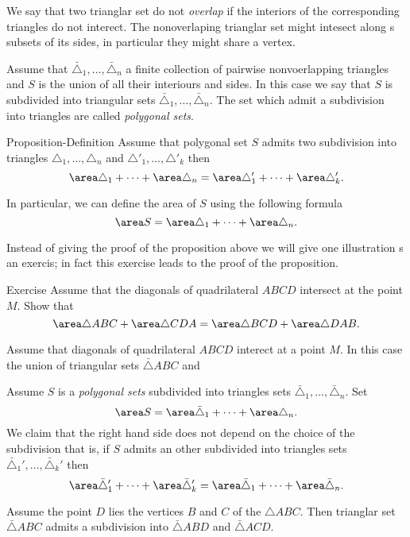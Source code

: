 We say that two trianglar set do not \emph{overlap} if the interiors of the corresponding triangles do not interect.
The nonoverlaping trianglar set might intesect along s subsets of its sides, in particular they might share a vertex.

Assume that  $\bar\triangle_1,\dots,\bar\triangle_n$ a finite collection of pairwise nonvoerlapping triangles
and $S$ is the union of all their interiours and sides.
In this case we say that $S$ is subdivided into triangular sets $\bar\triangle_1,\dots,\bar\triangle_n$.
The set which admit a subdivision into triangles are called \emph{polygonal sets}.

\begin{thm}{Proposition-Definition}
Assume that polygonal set $S$ admits two subdivision into triangles
$\triangle_1,\dots,\triangle_n$
and $\triangle'_1,\dots,\triangle'_k$
then
\[\area\triangle_1+\dots+\area\triangle_n
=\area\triangle'_1+\dots+\area\triangle'_k.\]

In particular, we can define the area of $S$ using the following formula
\[\area S=\area\triangle_1+\dots+\area\triangle_n.\]

\end{thm}

Instead of giving the proof of the proposition above we will give one illustration s an exercis;
in fact this exercise leads to the proof of the proposition.

\begin{thm}{Exercise}
Assume that the diagonals of quadrilateral $ABCD$ intersect at the point $M$.
Show that
\[\area\triangle ABC+\area\triangle CDA=\area\triangle BCD+\area\triangle DAB.\]
\end{thm}

Assume that diagonals of quadrilateral $ABCD$ interect at a point $M$.
In this case the union of triangular sets $\bar\triangle ABC$ and 

Assume $S$ is a \emph{polygonal sets} subdivided into triangles sets $\bar\triangle_1,\dots,\bar\triangle_n$.
Set 
\[\area S=\area\bar\triangle_1+\dots+\area\triangle_n.\]
We claim that the right hand side does not depend on the choice of the subdivision that is, if $S$ admits an other subdivided into triangles sets $\bar\triangle_1',\dots,\bar\triangle_k'$
then 
\[\area\bar\triangle'_1+\dots+\area\bar\triangle'_k
=
\area\bar\triangle_1+\dots+\area\bar\triangle_n.\]


Assume the point $D$ lies the vertices $B$ and $C$ of the $\triangle ABC$.
Then trianglar set $\bar\triangle ABC$ admits a subdivision into  $\bar\triangle ABD$ and $\bar\triangle ACD$.

